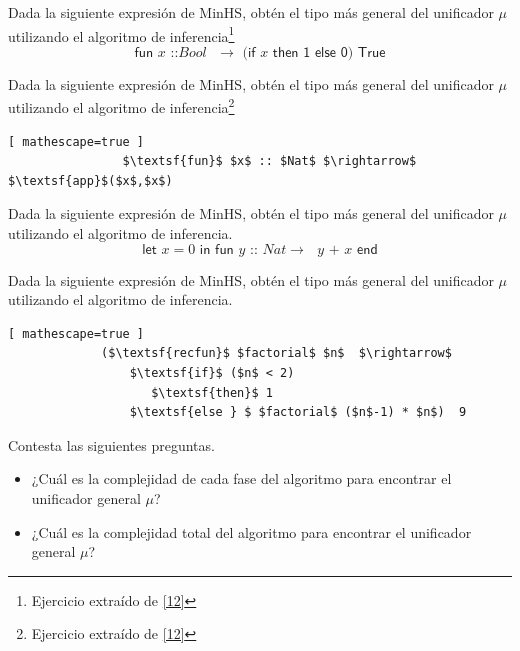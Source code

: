 \bigskip

    \begin{exercise} Dada la siguiente expresión de \textsf{MinHS}, obtén el tipo más general del unificador $\mu$ utilizando el algoritmo de inferencia\footnote{Ejercicio extraído de \hyperlink{12}{[12]}}
          \[
                \textsf{fun $x$ ::$Bool$ $\rightarrow$ (if $x$ then 1 else 0) True}
	\]
    \end{exercise}

\bigskip

    \begin{exercise} Dada la siguiente expresión de \textsf{MinHS}, obtén el tipo más general del unificador $\mu$ utilizando el algoritmo de inferencia\footnote{Ejercicio extraído de \hyperlink{12}{[12]}}
           \begin{lstlisting}[ mathescape=true ]
                $\textsf{fun}$ $x$ :: $Nat$ $\rightarrow$ $\textsf{app}$($x$,$x$)
           \end{lstlisting} 
    \end{exercise}

\bigskip

   \begin{exercise} Dada la siguiente expresión de \textsf{MinHS}, obtén el tipo más general del unificador $\mu$ utilizando el algoritmo de inferencia.
	\[
		\textsf{let $x = 0$ in fun $y$ :: $Nat \rightarrow$  $y$ + $x$ end}
	\]
   \end{exercise}

\bigskip
     \begin{exercise} Dada la siguiente expresión de \textsf{MinHS}, obtén el tipo más general del unificador $\mu$ utilizando el algoritmo de inferencia.
          \begin{lstlisting}[ mathescape=true ]
             ($\textsf{recfun}$ $factorial$ $n$  $\rightarrow$
                 $\textsf{if}$ ($n$ < 2) 
                    $\textsf{then}$ 1
                 $\textsf{else } $ $factorial$ ($n$-1) * $n$)  9
           \end{lstlisting}
     \end{exercise}

\bigskip

   \begin{exercise} Contesta las siguientes preguntas.\\
	\begin{itemize}
	    \item ¿Cuál es la complejidad de cada fase del algoritmo para encontrar el unificador general $\mu$?\\
           \item ¿Cuál es la complejidad total del algoritmo para encontrar el unificador general $\mu$?
	\end{itemize}
   \end{exercise}
